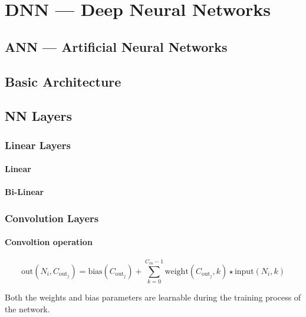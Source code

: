 

\chapter{DNN --- Deep Neural Networks}
\section{ANN --- Artificial Neural Networks}
\section{Basic Architecture}

\section{NN Layers}
\subsection{Linear Layers}
\subsubsection{Linear}
\subsubsection{Bi-Linear}

\subsection{Convolution Layers}
\subsubsection{Convoltion operation}
\begin{equation} \label{eq:conv_operation}
    \text{out}(N_i, C_{\text{out}_j}) = \text{bias}(C_{\text{out}_j}) +
    \sum_{k = 0}^{C_{in} - 1} \text{weight}(C_{\text{out}_j}, k)
    \star \text{input}(N_i, k)
\end{equation}

Both the weights and bias parameters are learnable during the training
process of the network.

